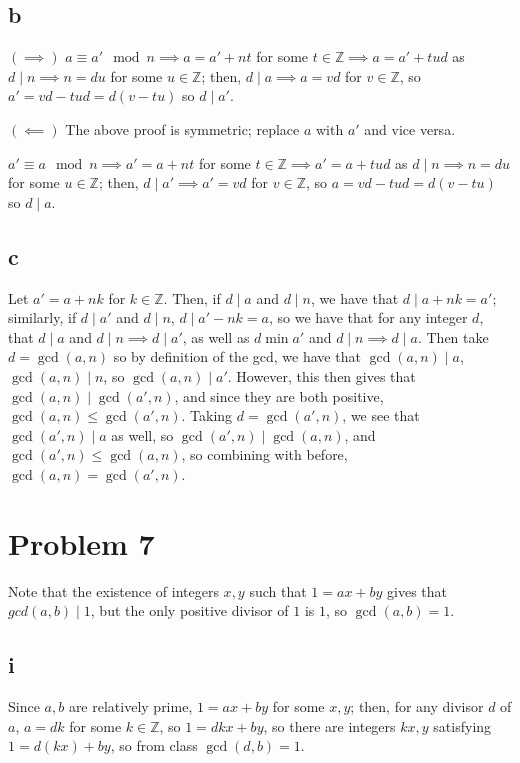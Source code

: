 \documentclass[12pt,letterpaper]{article}
\theoremstyle{definition}
\newcommand{\Z}{\mathbb{Z}}
\begin{document}
\subsection*{b}

$(\implies)$ $a \equiv a' \mod n \implies a = a' + nt$ for some $t \in \Z \implies a = a' + tud$ as $d \mid n \implies n = du$ for some $u \in \Z$; then, $d \mid a \implies a = vd$ for $v \in \Z$, so $a' = vd - tud = d(v - tu)$ so $d \mid a'$.

$(\impliedby)$ The above proof is symmetric; replace $a$ with $a'$ and vice versa.

$a' \equiv a \mod n \implies a' = a + nt$ for some $t \in \Z \implies a' = a + tud$ as $d \mid n \implies n = du$ for some $u \in \Z$; then, $d \mid a' \implies a' = vd$ for $v \in \Z$, so $a = vd - tud = d(v - tu)$ so $d \mid a$.

\subsection*{c}

Let $a' = a + nk$ for $k \in \Z$. Then, if $d \mid a$ and $d \mid n$, we have that $d \mid a + nk = a'$; similarly, if $d \mid a'$ and $d \mid n$, $d \mid a' - nk = a$, so we have that for any integer $d$, that $d \mid a$ and $d \mid n \implies d \mid a'$, as well as $d \min a'$ and $d \mid n \implies d \mid a$. Then take $d = \gcd(a,n)$ so by definition of the gcd, we have that $\gcd(a,n) \mid a$, $\gcd(a,n) \mid n$, so $\gcd(a,n) \mid a'$. However, this then gives that $\gcd(a,n) \mid \gcd(a', n)$, and since they are both positive, $\gcd(a,n) \leq \gcd(a',n)$. Taking $d = \gcd(a',n)$, we see that $\gcd(a',n) \mid a$ as well, so $\gcd(a',n) \mid \gcd(a, n)$, and $\gcd(a',n) \leq \gcd(a,n)$, so combining with before, $\gcd(a,n) = \gcd(a',n)$.

\section*{Problem 7}

Note that the existence of integers $x,y$ such that $1 = ax + by$ gives that $gcd(a,b) \mid 1$, but the only positive divisor of $1$ is $1$, so $\gcd(a,b) = 1$.

\subsection*{i}

Since $a,b$ are relatively prime,  $1 = ax + by$ for some $x, y$; then, for any divisor $d$ of $a$, $a = dk$ for some $k \in \Z$, so $1 = dkx + by$, so there are integers $kx, y$ satisfying $1 = d(kx) + by$, so from class $\gcd(d,b) = 1$.
\end{document}
